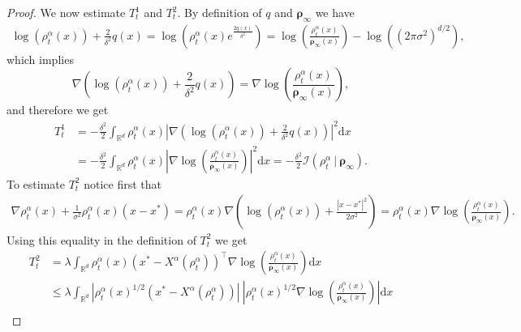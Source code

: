 \documentclass[reqno]{amsart}
\numberwithin{algorithm}{section}
\newcommand{\diff}{\mathrm{d}}
\newcommand{\Xalpha}{{X^\alpha}}
\begin{document}
{\begin{proof}
    We now estimate $T^1_t$ and $T^2_t.$
    By definition of $q$ and $\boldsymbol\rho_\infty$ we have
    \begin{equation}\begin{aligned}
        \log(\rho^\alpha_t(x))+\frac{2}{\delta^2}q(x) = \log\left(\rho^\alpha_t(x)e^{\frac{2q(x)}{\delta^2}}\right)  =  \log\left(\frac{\rho^\alpha_t(x)}{\boldsymbol\rho_\infty(x)}\right) - \log((2\pi\sigma^2)^{d/2}),
    \end{aligned}
    \end{equation}
    which implies $$\nabla\left( \log(\rho^\alpha_t(x))+\frac{2}{\delta^2}q(x)\right) = \nabla\log\left(\frac{\rho^\alpha_t(x)}{\boldsymbol\rho_\infty(x)}\right),$$
    and therefore we get
    \begin{equation}\begin{aligned}\label{eq:T1}
        T^1_t &= -\frac{\delta^2}{2}\int_{\mathbb{R}^d}\rho^\alpha_t(x)\left|\nabla\left (\log(\rho^\alpha_t(x))+\frac{2}{\delta^2}q(x)\right)\right|^2  \diff x\\
        &= -\frac{\delta^2}{2}\int_{\mathbb{R}^d}\rho^\alpha_t(x)\left| \nabla\log\left(\frac{\rho^\alpha_t(x)}{\boldsymbol\rho_\infty(x)}\right)\right|^2 \diff x = -\frac{\delta^2}{2}\mathcal I(\rho^\alpha_t\ | \ \boldsymbol\rho_\infty).
    \end{aligned}
    \end{equation}
    To estimate $T^2_t$ notice first that 
    \begin{equation*}\begin{aligned}
    \nabla\rho^\alpha_t(x)+\frac{1}{\sigma^2}\rho^\alpha_t(x)(x-x^*) = \rho^\alpha_t(x)\nabla\left(\log(\rho^\alpha_t(x))+\frac{ |x-x^*|^2}{2\sigma^2}\right) = \rho^\alpha_t(x)\nabla\log\left(\frac{\rho^\alpha_t(x)}{\boldsymbol\rho_\infty(x)}\right).
    \end{aligned}\end{equation*}
    Using this equality in the definition of $T^2_t$ we get
    \begin{equation}\begin{aligned}\label{eq:T2}
        T^2_t &= \lambda\int_{\mathbb{R}^d}\rho^\alpha_t(x)(x^*-\Xalpha(\rho^\alpha_t))^\top\nabla\log\left(\frac{\rho^\alpha_t(x)}{\boldsymbol\rho_\infty(x)}\right) \diff x \\
        &\leq\lambda\int_{\mathbb{R}^d}|\rho^\alpha_t(x)^{1/2}(x^*-\Xalpha(\rho^\alpha_t)) |\ \left|\rho^\alpha_t(x)^{1/2}\nabla\log\left(\frac{\rho^\alpha_t(x)}{\boldsymbol\rho_\infty(x)}\right)\right|\diff x\\

\end{aligned}
\end{equation}
\end{proof}}
\end{document}
